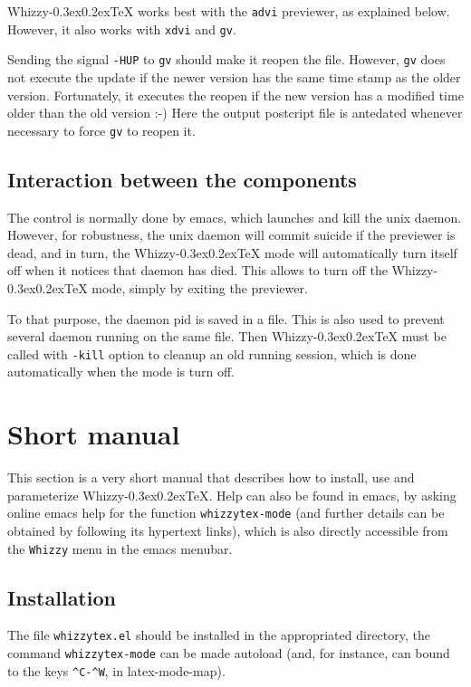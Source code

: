 \documentclass{article}
\let \lst \verb
\def \whizzy{{Whizzy\kern -0.3ex\raise 0.2ex\hbox{\TeX}}}
\begin{document}
{\whizzy} works best with the \lst"advi" previewer, as explained below. 
However, it also works with \lst"xdvi" and \lst"gv". 

Sending the signal \lst"-HUP" to \lst"gv" should make it reopen the file.
However, \lst"gv" does not execute the update if the newer version has the
same time stamp as the older version. Fortunately, it executes the reopen if
the new version has a modified time older than the old version :-) Here the
output postcript file  is antedated whenever necessary to force \lst"gv"
to reopen it.


\subsection {Interaction between the components} 

The control is normally done by emacs, which launches and kill the unix
daemon. However, for robustness, the unix daemon will commit suicide if the
previewer is dead, and in turn, the {\whizzy} mode will automatically turn
itself off when it notices that daemon has died. This allows to turn off
the {\whizzy} mode, simply by exiting the previewer.

To that purpose, the daemon pid is saved in a file. 
This is also used to prevent several daemon running on the same file. 
Then {\whizzy} must be called with \lst"-kill" option to cleanup an  old
running session, which is done automatically when the mode is turn off.


\section {Short manual} 
This section is a very short manual that describes how to install, use and
parameterize {\whizzy}. Help can also be found in emacs, by asking online
emacs help for the function \lst"whizzytex-mode" (and further details can be
obtained by following its hypertext links), which is also directly
accessible from the \lst"Whizzy" menu in the emacs menubar.

\subsection {Installation}

The file \lst"whizzytex.el" should be installed in the appropriated
directory, the command \lst"whizzytex-mode" can be made autoload (and, for
instance, can bound to the keys \lst"^C-^W", in latex-mode-map).
\end{document}
